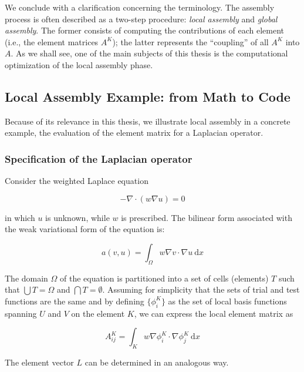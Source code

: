 We conclude with a clarification concerning the terminology. The assembly process is often described as a two-step procedure: {\em local assembly}  and {\em global assembly}. The former consists of computing the contributions of each element (i.e., the element matrices $A^K$); the latter represents the ``coupling'' of all $A^K$ into $A$. As we shall see, one of the main subjects of this thesis is the computational optimization of the local assembly phase.

\subsection{Local Assembly Example: from Math to Code}
\label{sec:bkg:math-to-code}
Because of its relevance in this thesis, we illustrate local assembly in a concrete example, the evaluation of the element matrix for a Laplacian operator. 

\subsubsection{Specification of the Laplacian operator}
Consider the weighted Laplace equation

\begin{equation}
- \nabla \cdot (w \nabla u) = 0
\end{equation}

in which $u$ is unknown, while $w$ is prescribed. The bilinear form associated with the weak variational form of the equation is:

\begin{equation}
\label{sec:bkg:eq:spec-laplacian}
a(v, u) = \int_\Omega w \nabla v \cdot \nabla u\ \mathrm{d}x
\end{equation}

The domain $\Omega$ of the equation is partitioned into a set of cells (elements) $T$ such that $\bigcup T = \Omega$ and $\bigcap T = \emptyset$. Assuming for simplicity that the sets of trial and test functions are the same and by defining $\lbrace \phi_i^K \rbrace$ as the set of local basis functions spanning $U$ and $V$ on the element $K$, we can express the local element matrix as

\begin{equation}
\label{sec:bkg:stiffness}
A_{ij}^K = \int_K w \nabla \phi_i^K \cdot \nabla \phi_j^K\ \mathrm{d}x
\end{equation}

The element vector $L$ can be determined in an analogous way. 

